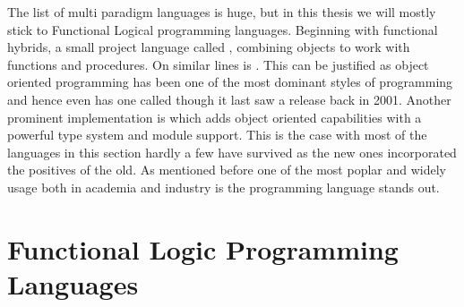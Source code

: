 \documentclass[proposal.tex]{subfiles}
\begin{document}
The list of multi paradigm languages is huge, but in this thesis we will mostly stick to Functional Logical programming languages. Beginning with functional hybrids, a small project language called  \cite{website:virgil}, combining objects to work with functions and procedures. On similar lines is  \cite{website:closwiki}. This can be justified as object oriented programming has been one of the most dominant styles of programming and hence even  has one called  \cite{website:ohaskell} though it last saw a release back in 2001. Another prominent implementation is  \cite{website:ocamlwiki,website:ocamllang} which adds object oriented capabilities with a powerful type system and module support. This is the case with most of the languages in this section hardly a few have survived as the new ones incorporated the positives of the old.  As mentioned before one of the most poplar \cite{website:langpop} and widely usage both in academia and industry is the  \cite{website:scala} programming language stands out.       

\begin{comment}
\begin{enumerate}
\item \progLang{Scala}, Object Functional Programming Language.

\item Virgil, Object Functional Programming Language.

\item CLOS, Common Lisp Object System.

\item .......................????????
\end{enumerate}
\end{comment}

\section{Functional Logic Programming Languages}
\end{document}

